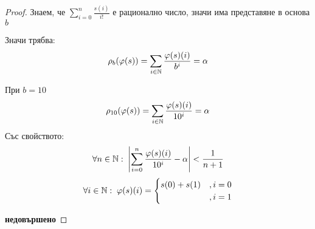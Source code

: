 \begin{proof}
    Знаем, че $\sum\limits_{i=0}^n \frac{s(i)}{i!}$ е рационално число, значи има представяне в основа $b$

    Значи трябва:
    \begin{equation}
        \rho_{b}(\varphi(s)) = \sum_{i\in{\mathbb{N}}} \frac{\varphi(s)(i)}{b^i} = \alpha
    \end{equation}

    При $b = 10$
    \begin{equation}
        \rho_{10}(\varphi(s)) = \sum_{i\in{\mathbb{N}}} \frac{\varphi(s)(i)}{10^i} = \alpha
    \end{equation}
    Със свойството:
    \begin{equation}
        \forall n\in{\mathbb{N}}:\; \left|\sum_{i=0}^n \frac{\varphi(s)(i)}{10^i} - \alpha\right| < \frac{1}{n+1}
    \end{equation}
    \begin{equation}
        \forall i\in {\mathbb{N}}:\; \varphi(s)(i) = \begin{cases}
            s(0) + s(1) & , i = 0 \\
            {}          & , i = 1
        \end{cases}
    \end{equation}


    \textbf{недовършено}
\end{proof}